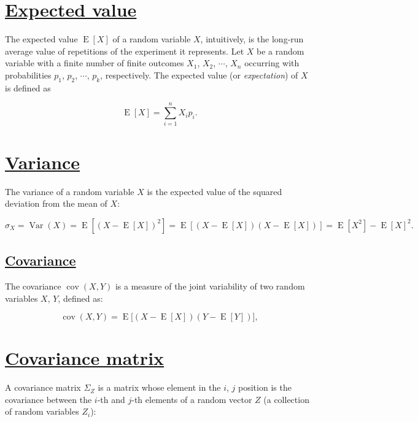 \section{\href{https://en.wikipedia.org/wiki/Expected_value}{Expected value}}
The expected value \(\operatorname{E}[X]\) of a random variable \(X\),
intuitively, is the long-run average value of repetitions of the
experiment it represents. Let \(X\) be a random variable with a finite
number of finite outcomes \(X_1\), \(X_2\), \(\cdots\), \(X_n\)
occurring with probabilities \(p_1\), \(p_2\), \(\cdots\), \(p_k\),
respectively. The expected value (or \emph{expectation}) of \(X\) is
defined as

\begin{equation}
  \operatorname{E}[X] = \sum_{i=1}^n X_ip_i.
\end{equation}

\section{\href{https://en.wikipedia.org/wiki/Variance}{Variance}}
The variance of a random variable \(X\) is the expected value of the
squared deviation from the mean of \(X\):

\begin{equation}
  \sigma_X=\operatorname{Var}(X) = \operatorname{E}\left[(X - \operatorname{E}[X])^2 \right] = \operatorname{E}\left[(X - \operatorname{E}[X])(X - \operatorname{E}[X]) \right] = \operatorname{E}\left[X^2 \right] - \operatorname{E}[X]^2.
\end{equation}

\subsection{\href{https://en.wikipedia.org/wiki/Covariance}{Covariance}}
The covariance \(\operatorname{cov}(X,Y)\) is a measure of the joint
variability of two random variables \(X\), \(Y\), defined as:

\begin{equation}
  \operatorname{cov}(X,Y) = \operatorname{E}{\big[(X - \operatorname{E}[X])(Y - \operatorname{E}[Y])\big]},
\end{equation}

\section{\href{https://en.wikipedia.org/wiki/Covariance_matrix}{Covariance
matrix}}
A covariance matrix \(\Sigma_Z\) is a matrix whose element in the \(i\),
\(j\) position is the covariance between the \(i\)-th and \(j\)-th
elements of a random vector \(Z\) (a collection of random variables
\(Z_i\)):

